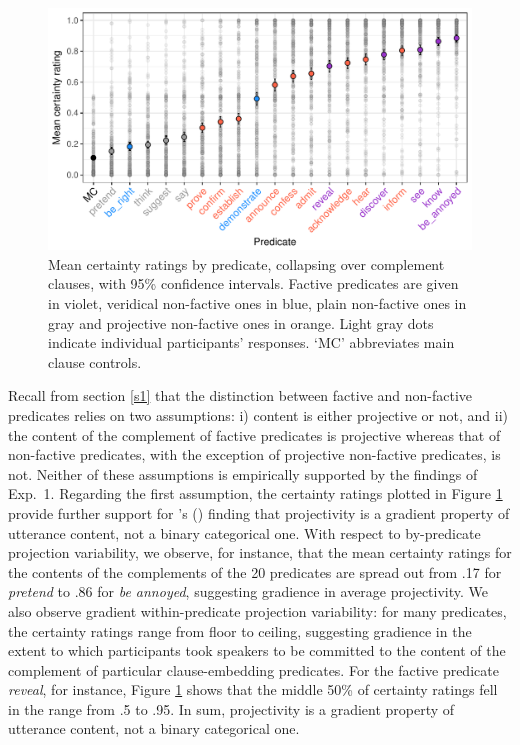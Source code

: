 \documentclass[11pt,fleqn]{article}
\newcommand{\6}{\mbox{$[\hspace*{-.6mm}[$}}
\newcommand{\9}{\mbox{$]\hspace*{-.6mm}]$}}
\newcommand{\citetpos}[1]{\citeauthor{#1}'s (\citeyear{#1})}
\begin{document}
\begin{figure}[H]
\centering

\includegraphics[width=.7\paperwidth]{../results/5-projectivity-no-fact/graphs/means-projectivity-by-predicate-variability}

\caption{Mean certainty ratings by predicate, collapsing over complement clauses, with 95\% confidence intervals. Factive predicates are given in violet, veridical non-factive ones in blue, plain non-factive ones in gray and projective non-factive ones in orange. Light gray dots indicate individual participants' responses. `MC' abbreviates main clause controls.}
\label{f-projectivity}
\end{figure}

Recall from section \ref{s1} that the distinction between factive and non-factive predicates relies on two assumptions: i) content is either projective or not, and ii) the content of the complement of factive predicates is projective whereas that of non-factive predicates, with the exception of projective non-factive predicates, is not.  Neither of these assumptions is empirically supported by the findings of Exp.~1. Regarding the first assumption, the certainty ratings plotted in Figure \ref{f-projectivity} provide further support for  \citetpos{tbd-variability} finding that projectivity is a gradient property of utterance content, not a binary categorical one.  With respect to by-predicate projection variability, we observe, for instance, that the mean certainty ratings for the contents of the complements of the 20 predicates are spread out from .17 for {\em pretend} to .86 for {\em be annoyed}, suggesting gradience in average projectivity. We also observe gradient within-predicate projection variability: for many predicates, the certainty ratings range from floor to ceiling, suggesting gradience in the extent to which participants took speakers to be committed to the content of the complement of particular clause-embedding predicates. For the factive predicate {\em reveal}, for instance, Figure \ref{f-projectivity} shows that the middle 50\% of certainty ratings fell in the range from .5 to .95. In sum, projectivity is a gradient property of utterance content, not a binary categorical one.
\end{document}
